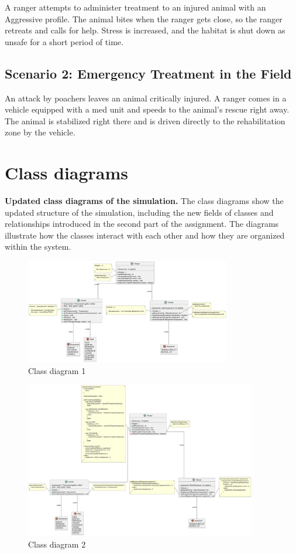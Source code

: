 \documentclass[a4paper,12pt]{article}
\begin{document}
A ranger attempts to administer treatment to an injured animal with an Aggressive profile. The animal bites when the ranger gets close, so the ranger retreats and calls for help. Stress is increased, and the habitat is shut down as unsafe for a short period of time.

\subsection{Scenario 2: Emergency Treatment in the Field}
An attack by poachers leaves an animal critically injured. A ranger comes in a vehicle equipped with a med unit and speeds to the animal’s rescue right away. The animal is stabilized right there and is driven directly to the rehabilitation zone by the vehicle.

\newpage

\section{\textbf{Class diagrams}}
\textbf{Updated class diagrams of the simulation.}
The class diagrams show the updated structure of the simulation, including the new fields of classes and relationships introduced in the second part of the assignment. The diagrams illustrate how the classes interact with each other and how they are organized within the system.
\begin{figure}[H]
    \centering
    \includegraphics[width=0.8\textwidth]{class-diagram1.png}
    \caption{Class diagram 1}
    \label{fig:class-diagram1}
\end{figure}

\begin{figure}[H]
    \centering
    \includegraphics[width=0.9\textwidth]{class-diagram2.png}
    \caption{Class diagram 2}
    \label{fig:class-diagram2}
\end{figure}
\end{document}
